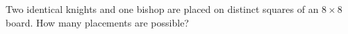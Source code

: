 Two identical knights and one bishop are placed on distinct squares of an $8\times8$ board. How many placements are possible?
